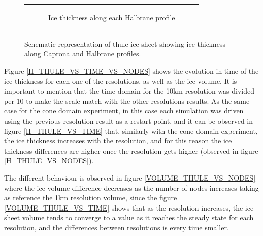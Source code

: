 \documentclass{article}
\begin{document}
\begin{figure}[!h]
\begin{tabular}[c]{@{}c@{}}
\begin{subfigure}[c]{.48\linewidth}
      \caption
        {%
          Ice thickness along each Halbrane profile%
          \label{Halbranes_thule}%
        }%
    \end{subfigure}
  \end{tabular}
  \caption
    {%
      Schematic representation of thule ice sheet showing ice thickness along Caprona and Halbrane profiles.%
      \label{Thule_profiles_capronas_and_halbranes}%
    }
\end{figure}

Figure \ref{H_THULE_VS_TIME_VS_NODES} shows the evolution in time of the ice thickness for each one of the resolutions, as well as the ice  volume. It is important to mention that the time domain for the 10km resolution was divided per 10 to make the scale match with the other resolutions results. As the same case for the cone domain experiment, in this case each simulation was driven using the previous resolution result as a restart point, and it can be observed in figure \ref{H_THULE_VS_TIME} that, similarly with the cone domain experiment, the ice thickness increases with the resolution, and for this reason the ice thickness differences are higher once the resolution gets higher (observed in figure \ref{H_THULE_VS_NODES}). 

The different behaviour is observed in figure \ref{VOLUME_THULE_VS_NODES} where the ice volume difference decreases as the number of nodes increases taking as reference the 1km resolution volume, since the figure \ref{VOLUME_THULE_VS_TIME} shows that as the resolution increases, the ice sheet volume tends to converge to a value as it reaches the steady state for each resolution, and the differences between resolutions is every time smaller. 
\end{document}
